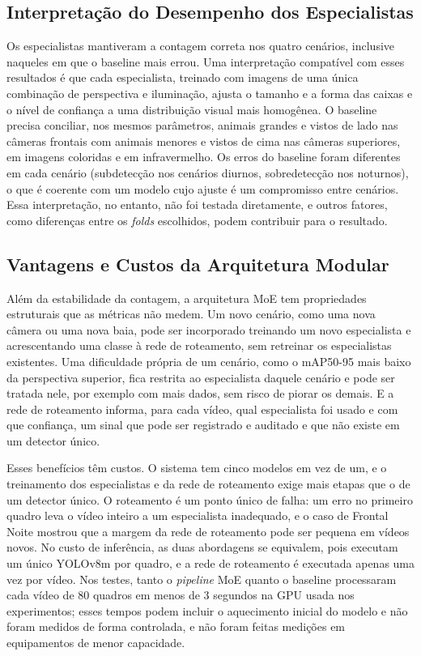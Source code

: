 \subsection{Interpretação do Desempenho dos Especialistas}
\label{subsec:disc-especialistas}

Os especialistas mantiveram a contagem correta nos quatro cenários, inclusive naqueles em que o baseline mais errou. Uma interpretação compatível com esses resultados é que cada especialista, treinado com imagens de uma única combinação de perspectiva e iluminação, ajusta o tamanho e a forma das caixas e o nível de confiança a uma distribuição visual mais homogênea. O baseline precisa conciliar, nos mesmos parâmetros, animais grandes e vistos de lado nas câmeras frontais com animais menores e vistos de cima nas câmeras superiores, em imagens coloridas e em infravermelho. Os erros do baseline foram diferentes em cada cenário (subdetecção nos cenários diurnos, sobredetecção nos noturnos), o que é coerente com um modelo cujo ajuste é um compromisso entre cenários. Essa interpretação, no entanto, não foi testada diretamente, e outros fatores, como diferenças entre os \textit{folds} escolhidos, podem contribuir para o resultado.

\subsection{Vantagens e Custos da Arquitetura Modular}
\label{subsec:disc-modularidade}

Além da estabilidade da contagem, a arquitetura MoE tem propriedades estruturais que as métricas não medem. Um novo cenário, como uma nova câmera ou uma nova baia, pode ser incorporado treinando um novo especialista e acrescentando uma classe à rede de roteamento, sem retreinar os especialistas existentes. Uma dificuldade própria de um cenário, como o mAP50-95 mais baixo da perspectiva superior, fica restrita ao especialista daquele cenário e pode ser tratada nele, por exemplo com mais dados, sem risco de piorar os demais. E a rede de roteamento informa, para cada vídeo, qual especialista foi usado e com que confiança, um sinal que pode ser registrado e auditado e que não existe em um detector único.

Esses benefícios têm custos. O sistema tem cinco modelos em vez de um, e o treinamento dos especialistas e da rede de roteamento exige mais etapas que o de um detector único. O roteamento é um ponto único de falha: um erro no primeiro quadro leva o vídeo inteiro a um especialista inadequado, e o caso de Frontal Noite mostrou que a margem da rede de roteamento pode ser pequena em vídeos novos. No custo de inferência, as duas abordagens se equivalem, pois executam um único YOLOv8m por quadro, e a rede de roteamento é executada apenas uma vez por vídeo. Nos testes, tanto o \textit{pipeline} MoE quanto o baseline processaram cada vídeo de 80 quadros em menos de 3 segundos na GPU usada nos experimentos; esses tempos podem incluir o aquecimento inicial do modelo e não foram medidos de forma controlada, e não foram feitas medições em equipamentos de menor capacidade.

